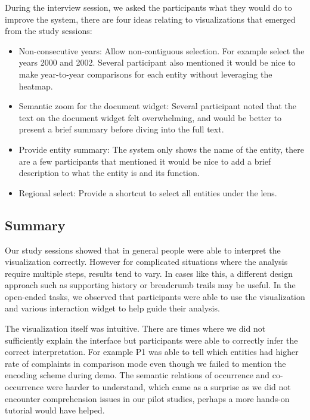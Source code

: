 During the interview session, we asked the participants what they would do to
improve the system, there are four ideas relating to visualizations that emerged
from the study sessions:
\begin{itemize}[noitemsep]
  \item Non-consecutive years: Allow non-contiguous selection. For
  example select the years 2000 and 2002. Several participant also mentioned it
  would be nice to make year-to-year comparisons for each entity without
  leveraging the heatmap.
  
  \item Semantic zoom for the document widget: Several participant noted that
  the text on the document widget felt overwhelming, and would be better to
  present a brief summary before diving into the full text.
  
  \item Provide entity summary: The system only shows the name of the entity,
  there are a few participants that mentioned it would be nice to add a brief
  description to what the entity is and its function.
  
  \item Regional select: Provide a shortcut to select all entities under the
  lens.
\end{itemize}
   
  
\subsection{Summary}
Our study sessions showed that in general people were able to interpret the
visualization correctly. However for complicated situations where the analysis
require multiple steps, results tend to vary. In cases like this, a different
design approach such as supporting history or breadcrumb trails may be useful.
In the open-ended tasks, we observed that participants were able to use the
visualization and various interaction widget to help guide their analysis.

The visualization itself was intuitive. There are times where we did not
sufficiently explain the interface but participants were able to correctly infer
the correct interpretation. For example P1 was able to tell which entities had higher rate
of complaints in comparison mode even though we failed to mention the encoding scheme during demo. 
The semantic relations of occurrence and co-occurrence were harder to understand, which 
came as a surprise as we did not encounter comprehension issues in our pilot studies, 
perhaps a more hands-on tutorial would have helped.

